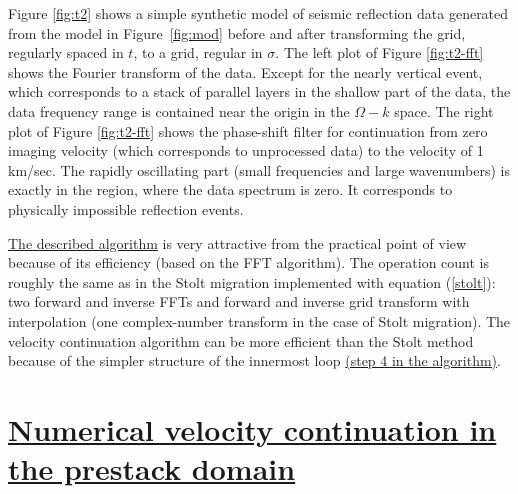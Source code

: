 Figure \ref{fig:t2} shows a simple synthetic model of seismic
reflection data generated from the model in Figure~\ref{fig:mod}
before and after transforming the grid, regularly spaced in $t$, to a
grid, regular in $\sigma$. The left plot of Figure \ref{fig:t2-fft}
shows the Fourier transform of the data. Except for the nearly
vertical event, which corresponds to a stack of parallel layers in the
shallow part of the data, the data frequency range is contained near
the origin in the $\Omega-k$ space.  The right plot of Figure
\ref{fig:t2-fft} shows the phase-shift filter for continuation from
zero imaging velocity (which corresponds to unprocessed data) to the
velocity of 1 km/sec. The rapidly oscillating part (small frequencies
and large wavenumbers) is exactly in the region, where the data
spectrum is zero. It corresponds to physically impossible reflection
events.


\uline{The described algorithm}
 is very attractive from the practical point of view
because of its efficiency (based on the FFT algorithm). The operation count is
roughly the same as in the Stolt migration implemented with equation
(\ref{stolt}): two forward and inverse FFTs and forward and inverse grid
transform with interpolation (one complex-number transform in the case of
Stolt migration). The velocity continuation algorithm can be more efficient
than the Stolt method because of the simpler structure of the innermost loop
\uline{(step 4 in the algorithm)}. 

\section{\uline{Numerical velocity continuation in the prestack domain}}

